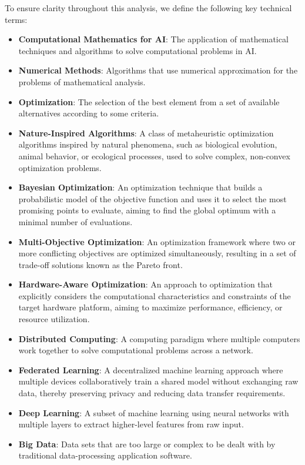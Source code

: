\documentclass[acmsmall]{acmart}
\begin{document}
To ensure clarity throughout this analysis, we define the following key technical terms:
\begin{itemize}
    \item \textbf{Computational Mathematics for AI}: The application of mathematical techniques and algorithms to solve computational problems in AI.
    \item \textbf{Numerical Methods}: Algorithms that use numerical approximation for the problems of mathematical analysis.
    \item \textbf{Optimization}: The selection of the best element from a set of available alternatives according to some criteria.
    \item \textbf{Nature-Inspired Algorithms}: A class of metaheuristic optimization algorithms inspired by natural phenomena, such as biological evolution, animal behavior, or ecological processes, used to solve complex, non-convex optimization problems.
    \item \textbf{Bayesian Optimization}: An optimization technique that builds a probabilistic model of the objective function and uses it to select the most promising points to evaluate, aiming to find the global optimum with a minimal number of evaluations.
    \item \textbf{Multi-Objective Optimization}: An optimization framework where two or more conflicting objectives are optimized simultaneously, resulting in a set of trade-off solutions known as the Pareto front.
    \item \textbf{Hardware-Aware Optimization}: An approach to optimization that explicitly considers the computational characteristics and constraints of the target hardware platform, aiming to maximize performance, efficiency, or resource utilization.
    \item \textbf{Distributed Computing}: A computing paradigm where multiple computers work together to solve computational problems across a network.
    \item \textbf{Federated Learning}: A decentralized machine learning approach where multiple devices collaboratively train a shared model without exchanging raw data, thereby preserving privacy and reducing data transfer requirements.
    \item \textbf{Deep Learning}: A subset of machine learning using neural networks with multiple layers to extract higher-level features from raw input.
    \item \textbf{Big Data}: Data sets that are too large or complex to be dealt with by traditional data-processing application software.

\end{itemize}
\end{document}
